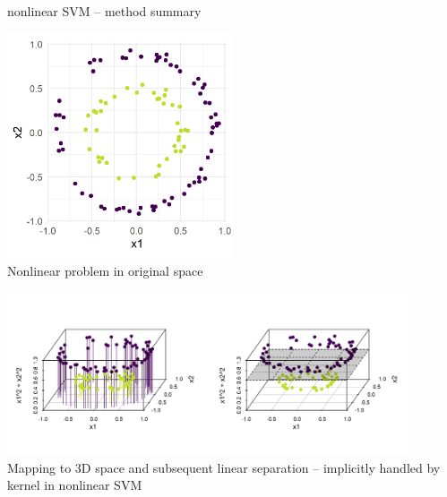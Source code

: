 \begin{frame}{nonlinear SVM -- method summary}
\begin{minipage}[b]{0.33\textwidth}
  \centering
  \includegraphics[width=0.5\textwidth]{
  figure/circles_ds.png} \\
  \tiny{Nonlinear problem in original space} 
\end{minipage}
\begin{minipage}[b]{0.66\textwidth}
  \centering
  \includegraphics[width=0.9\textwidth, trim=0 30 0 0, clip]{
  figure/circles_feature_map.png} \\
  \tiny{Mapping to 3D space and subsequent linear separation -- implicitly 
  handled by kernel in nonlinear SVM}
\end{minipage}

\end{frame}


